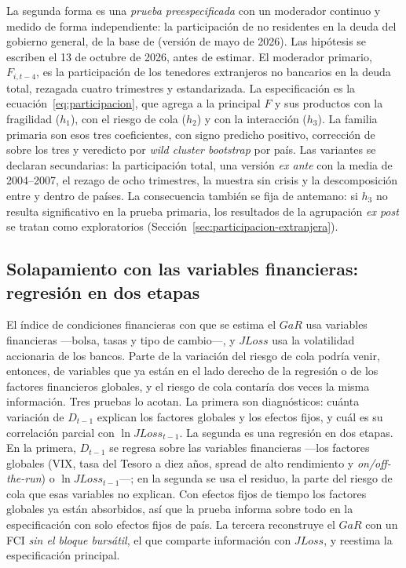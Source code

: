 La segunda forma es una \emph{prueba preespecificada} con un moderador continuo y medido de forma independiente: la participación de no residentes en la deuda del gobierno general, de la base de \citet{ArslanalpTsuda2014} (versión de mayo de 2026). Las hipótesis se escriben el 13 de octubre de 2026, antes de estimar. El moderador primario, $F_{i,t-4}$, es la participación de los tenedores extranjeros no bancarios en la deuda total, rezagada cuatro trimestres y estandarizada. La especificación es la ecuación~\eqref{eq:participacion}, que agrega a la principal $F$ y sus productos con la fragilidad ($h_1$), con el riesgo de cola ($h_2$) y con la interacción ($h_3$). La familia primaria son esos tres coeficientes, con signo predicho positivo, corrección de \citet{Holm1979} sobre los tres y veredicto por \textit{wild cluster bootstrap} por país. Las variantes se declaran secundarias: la participación total, una versión \textit{ex ante} con la media de 2004--2007, el rezago de ocho trimestres, la muestra sin crisis y la descomposición entre y dentro de países. La consecuencia también se fija de antemano: si $h_3$ no resulta significativo en la prueba primaria, los resultados de la agrupación \textit{ex post} se tratan como exploratorios (Sección~\ref{sec:participacion-extranjera}).

\subsection{Solapamiento con las variables financieras: regresión en dos etapas}
\label{sec:est-solapamiento}

El índice de condiciones financieras con que se estima el $GaR$ usa variables financieras ---bolsa, tasas y tipo de cambio---, y $JLoss$ usa la volatilidad accionaria de los bancos. Parte de la variación del riesgo de cola podría venir, entonces, de variables que ya están en el lado derecho de la regresión o de los factores financieros globales, y el riesgo de cola contaría dos veces la misma información. Tres pruebas lo acotan. La primera son diagnósticos: cuánta variación de $D_{t-1}$ explican los factores globales y los efectos fijos, y cuál es su correlación parcial con $\ln JLoss_{t-1}$. La segunda es una regresión en dos etapas. En la primera, $D_{t-1}$ se regresa sobre las variables financieras ---los factores globales (VIX, tasa del Tesoro a diez años, spread de alto rendimiento y \textit{on/off-the-run}) o $\ln JLoss_{t-1}$---; en la segunda se usa el residuo, la parte del riesgo de cola que esas variables no explican. Con efectos fijos de tiempo los factores globales ya están absorbidos, así que la prueba informa sobre todo en la especificación con solo efectos fijos de país. La tercera reconstruye el $GaR$ con un FCI \emph{sin el bloque bursátil}, el que comparte información con $JLoss$, y reestima la especificación principal.

